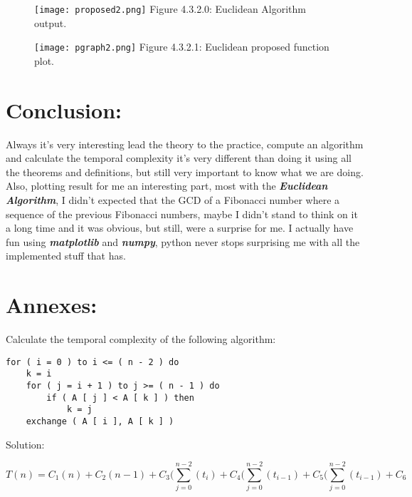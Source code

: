 \documentclass[10pt,a4paper]{article}
\begin{document}
\begin{figure}[H]
\texttt{[image: proposed2.png]}
\centering \linebreak \linebreak Figure 4.3.2.0: Euclidean Algorithm output.
\end{figure}

\begin{figure}[H]
\texttt{[image: pgraph2.png]}
\centering \linebreak \linebreak Figure 4.3.2.1: Euclidean proposed function plot.
\end{figure}

\pagebreak

\section{Conclusion:}

Always it's very interesting lead the theory to the practice, compute an algorithm and calculate the temporal complexity it's very different than doing it using all the theorems and definitions, but still very important to know what we are doing. Also, plotting result for me an interesting part, most with the {\bfseries\itshape Euclidean Algorithm}, I didn't expected that the GCD of a Fibonacci number where a sequence of the previous Fibonacci numbers, maybe I didn't stand to think on it a long time and it was obvious, but still, were a surprise for me. I actually have fun using {\bfseries\itshape matplotlib} and {\bfseries\itshape numpy}, python never stops surprising me with all the implemented stuff that has. \hfill \break

\pagebreak

\section{Annexes:}

Calculate the temporal complexity of the following algorithm:

\begin{lstlisting}
for ( i = 0 ) to i <= ( n - 2 ) do
	k = i
	for ( j = i + 1 ) to j >= ( n - 1 ) do
		if ( A [ j ] < A [ k ] ) then 
			k = j
	exchange ( A [ i ], A [ k ] )
\end{lstlisting}

Solution:

\begin{equation}
T ( n ) = C_{1}( n ) + C_{2}( n- 1) + C_{3} ( \sum_{j = 0}^{n - 2} ( t_{i} ) + C_{4} ( \sum_{j = 0}^{n - 2} ( t_{i - 1} ) + C_{5} ( \sum_{j = 0}^{n - 2 } ( t_{i - 1} ) + C_{6} 
\end{equation}
\end{document}
